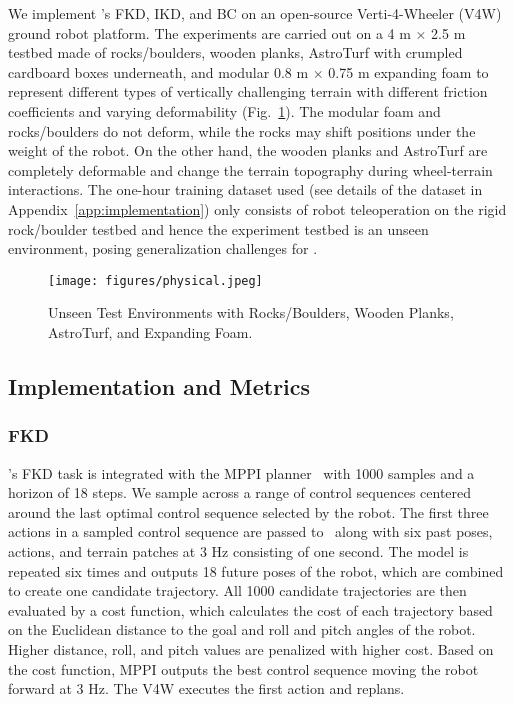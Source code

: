We implement \former's FKD, IKD, and BC on an open-source Verti-4-Wheeler (V4W) ground robot platform. The experiments are carried out on a 4 m $\times$ 2.5 m testbed made of rocks/boulders, wooden planks, AstroTurf with crumpled cardboard boxes underneath, and modular 0.8 m $\times$ 0.75 m expanding foam to represent different types of vertically challenging terrain with different friction coefficients and varying deformability (Fig.~\ref{fig::test_env}). The modular foam and rocks/boulders do not deform, while the rocks may shift positions under the weight of the robot. On the other hand, the wooden planks and AstroTurf are completely deformable and change the terrain topography during wheel-terrain interactions. The one-hour training dataset used (see details of the dataset in Appendix~\ref{app:implementation}) only consists of robot teleoperation on the rigid rock/boulder testbed and hence the experiment testbed is an unseen environment, posing generalization challenges for \former. 

\begin{figure}[ht]
    \centering
    \texttt{[image: figures/physical.jpeg]}
    \caption{Unseen Test Environments with Rocks/Boulders, Wooden Planks, AstroTurf, and Expanding Foam. }
    \label{fig::test_env}
    \vspace{-1.2em}
\end{figure}

\subsection{Implementation and Metrics}

\subsubsection{FKD} \former's FKD task is integrated with the  MPPI planner~\cite{williams2017model} with 1000 samples and a horizon of 18 steps. We sample across a range of control sequences centered around the last optimal control sequence selected by the robot. The first three actions in a sampled control sequence are passed to \former~along with six past poses, actions, and terrain patches at 3 Hz consisting of one second. The model is repeated six times and outputs 18 future poses of the robot, which are combined to create one candidate trajectory. All 1000 candidate trajectories are then evaluated by a cost function, which calculates the cost of each trajectory based on the Euclidean distance to the goal and roll and pitch angles of the robot. Higher distance, roll, and pitch values are penalized with higher cost. Based on the cost function, MPPI outputs the best control sequence moving the robot forward at 3 Hz. The V4W executes the first action and replans.

